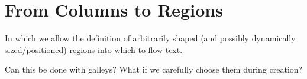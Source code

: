 \chapter{From Columns to Regions}\label{ch:regions}

In which we allow the definition of arbitrarily shaped (and possibly dynamically sized/positioned)
regions into which to flow text.

Can this be done with galleys? What if we carefully choose them during creation?

